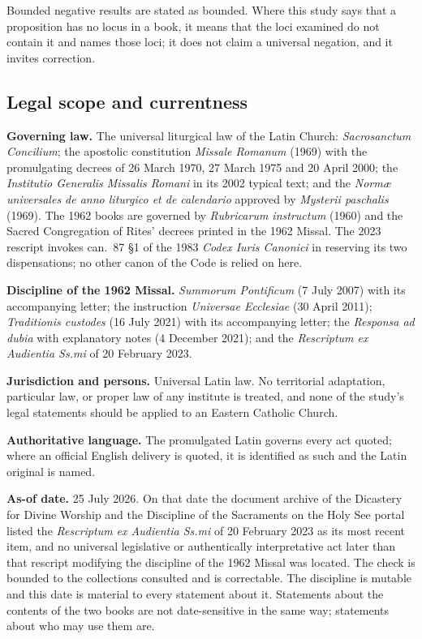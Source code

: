 Bounded negative results are stated as bounded. Where this study says that a proposition has no locus in a book, it means that the loci examined do not contain it and names those loci; it does not claim a universal negation, and it invites correction.

\subsection*{Legal scope and currentness}

\textbf{Governing law.} The universal liturgical law of the Latin Church: \emph{Sacrosanctum Concilium}; the apostolic constitution \emph{Missale Romanum} (1969) with the promulgating decrees of 26 March 1970, 27 March 1975 and 20 April 2000; the \emph{Institutio Generalis Missalis Romani} in its 2002 typical text; and the \emph{Normæ universales de anno liturgico et de calendario} approved by \emph{Mysterii paschalis} (1969). The 1962 books are governed by \emph{Rubricarum instructum} (1960) and the Sacred Congregation of Rites' decrees printed in the 1962 Missal. The 2023 rescript invokes can.~87 \S 1 of the 1983 \emph{Codex Iuris Canonici} in reserving its two dispensations; no other canon of the Code is relied on here.

\textbf{Discipline of the 1962 Missal.} \emph{Summorum Pontificum} (7 July 2007) with its accompanying letter; the instruction \emph{Universae Ecclesiae} (30 April 2011); \emph{Traditionis custodes} (16 July 2021) with its accompanying letter; the \emph{Responsa ad dubia} with explanatory notes (4 December 2021); and the \emph{Rescriptum ex Audientia Ss.mi} of 20 February 2023.

\textbf{Jurisdiction and persons.} Universal Latin law. No territorial adaptation, particular law, or proper law of any institute is treated, and none of the study's legal statements should be applied to an Eastern Catholic Church.

\textbf{Authoritative language.} The promulgated Latin governs every act quoted; where an official English delivery is quoted, it is identified as such and the Latin original is named.

\textbf{As-of date.} 25 July 2026. On that date the document archive of the Dicastery for Divine Worship and the Discipline of the Sacraments on the Holy See portal listed the \emph{Rescriptum ex Audientia Ss.mi} of 20 February 2023 as its most recent item, and no universal legislative or authentically interpretative act later than that rescript modifying the discipline of the 1962 Missal was located. The check is bounded to the collections consulted and is correctable. The discipline is mutable and this date is material to every statement about it. Statements about the contents of the two books are not date-sensitive in the same way; statements about who may use them are.

